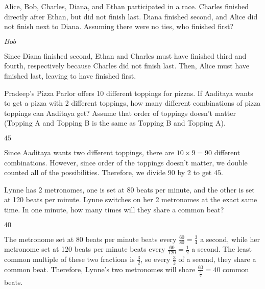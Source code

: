 \documentclass[11pt]{article}
\begin{document}
\begin{problem} %
Alice, Bob, Charles, Diana, and Ethan participated in a race. Charles finished directly after Ethan, but did not finish last. Diana finished second, and Alice did not finish next to Diana. Assuming there were no ties, who finished first?
\end{problem}
\begin{answer}
$\boxed{Bob}$
\end{answer}
\begin{solution}
Since Diana finished second, Ethan and Charles must have finished third and fourth, respectively because Charles did not finish last. Then, Alice must have finished last, leaving  to have finished first.
\end{solution}

\begin{problem} %
Pradeep's Pizza Parlor offers 10 different toppings for pizzas. If Aaditaya wants to get a pizza with 2 different toppings, how many different combinations of pizza toppings can Aaditaya get? Assume that order of toppings doesn't matter (Topping A and Topping B is the same as Topping B and Topping A).
\end{problem}
\begin{answer}
$\boxed{45}$
\end{answer}
\begin{solution}
Since Aaditaya wants two different toppings, there are $10\times9 = 90$ different combinations. However, since order of the toppings doesn't matter, we double counted all of the possibilities. Therefore, we divide 90 by 2 to get $\boxed{45}$.
\end{solution}

\begin{problem} %
Lynne has 2 metronomes, one is set at 80 beats per minute, and the other is set at 120 beats per minute. Lynne switches on her 2 metronomes at the exact same time. In one minute, how many times will they share a common beat?
\end{problem}
\begin{answer}
$\boxed{40}$
\end{answer}
\begin{solution}
The metronome set at 80 beats per minute beats every $\frac{60}{80} = \frac{3}{4}$ a second, while her metronome set at 120 beats per minute beats every $\frac{60}{120} = \frac{1}{2}$ a second. The least common multiple of these two fractions is $\frac{3}{2}$, so every $\frac{3}{2}$ of a second, they share a common beat. Therefore, Lynne's two metronomes will share $\frac{60}{\frac{3}{2}} = \boxed{40}$ common beats.
\end{solution}
\end{document}
